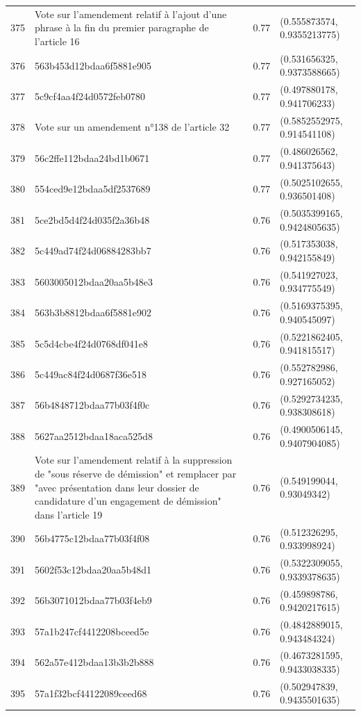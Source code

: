 \begin{table}[ht]
\begin{tabular}{rlrl}
  375 & Vote sur l'amendement relatif à l'ajout d'une phrase à la fin du premier paragraphe de l'article 16 & 0.77 & (0.555873574, 0.9355213775) \\ 
  376 & 563b453d12bdaa6f5881e905 & 0.77 & (0.531656325, 0.9373588665) \\ 
  377 & 5c9cf4aa4f24d0572feb0780 & 0.77 & (0.497880178, 0.941706233) \\ 
  378 & Vote sur un amendement n°138 de l'article 32 & 0.77 & (0.5852552975, 0.914541108) \\ 
  379 & 56c2ffe112bdaa24bd1b0671 & 0.77 & (0.486026562, 0.941375643) \\ 
  380 & 554ced9e12bdaa5df2537689 & 0.77 & (0.5025102655, 0.936501408) \\ 
  381 & 5ce2bd5d4f24d035f2a36b48 & 0.76 & (0.5035399165, 0.9424805635) \\ 
  382 & 5c449ad74f24d06884283bb7 & 0.76 & (0.517353038, 0.942155849) \\ 
  383 & 5603005012bdaa20aa5b48e3 & 0.76 & (0.541927023, 0.934775549) \\ 
  384 & 563b3b8812bdaa6f5881e902 & 0.76 & (0.5169375395, 0.940545097) \\ 
  385 & 5c5d4cbe4f24d0768df041e8 & 0.76 & (0.5221862405, 0.941815517) \\ 
  386 & 5c449ac84f24d0687f36e518 & 0.76 & (0.552782986, 0.927165052) \\ 
  387 & 56b4848712bdaa77b03f4f0c & 0.76 & (0.5292734235, 0.938308618) \\ 
  388 & 5627aa2512bdaa18aca525d8 & 0.76 & (0.4900506145, 0.9407904085) \\ 
  389 & Vote sur l'amendement relatif à la suppression de "sous réserve de démission" et remplacer par "avec présentation dans leur dossier de candidature d'un engagement de démission" dans l'article 19 & 0.76 & (0.549199044, 0.93049342) \\ 
  390 & 56b4775c12bdaa77b03f4f08 & 0.76 & (0.512326295, 0.933998924) \\ 
  391 & 5602f53c12bdaa20aa5b48d1 & 0.76 & (0.5322309055, 0.9339378635) \\ 
  392 & 56b3071012bdaa77b03f4eb9 & 0.76 & (0.459898786, 0.9420217615) \\ 
  393 & 57a1b247cf4412208bceed5e & 0.76 & (0.4842889015, 0.943484324) \\ 
  394 & 562a57e412bdaa13b3b2b888 & 0.76 & (0.4673281595, 0.9433038335) \\ 
  395 & 57a1f32bcf44122089ceed68 & 0.76 & (0.502947839, 0.9435501635) \\ 

\end{tabular}
\end{table}
